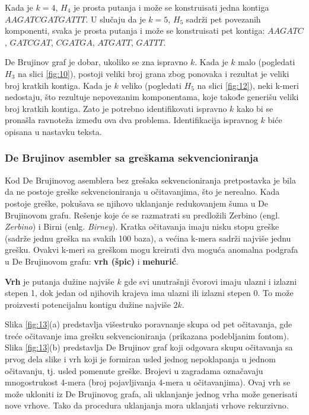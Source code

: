 \documentclass[12pt,oneside]{memoir}
\begin{document}
Kada je $k = 4$, $H_4$ je prosta putanja i može se konstruisati jedna kontiga $AAGATCGATGATTT$. U slučaju da je $k = 5$, $H_5$ sadrži pet povezanih komponenti, svaka je prosta putanja i može se konstruisati pet kontiga: $AAGATC$, $GATCGAT$, $CGATGA$, $ATGATT$, $GATTT$.

De Brujinov graf je dobar, ukoliko se zna ispravno $k$. Kada je $k$ malo (pogledati $H_3$ na slici \ref{fig:10}), postoji veliki broj grana zbog ponovaka i rezultat je veliki broj kratkih kontiga. Kada je $k$ veliko (pogledati $H_5$ na slici \ref{fig:12}), neki k-meri nedostaju, što rezultuje nepovezanim komponentama, koje takođe generišu veliki broj kratkih kontiga. Zato je potrebno identifikovati ispravno $k$ kako bi se pronašla ravnoteža između ova dva problema. Identifikacija ispravnog $k$ biće opisana u nastavku teksta.

\subsubsection{De Brujinov asembler sa greškama sekvencioniranja}

Kod De Brujinovog asemblera bez grešaka sekvencioniranja pretpostavka je bila da ne postoje greške sekvencioniranja u očitavanjima, što je nerealno. Kada postoje greške, pokušava se njihovo uklanjanje redukovanjem šuma u De Brujinovom grafu. Rešenje koje će se razmatrati su predložili Zerbino (engl. \textit{Zerbino}) i Birni (enlg. \textit{Birney}). Kratka očitavanja imaju nisku stopu greške (sadrže jednu greška na svakih 100 baza), a većina k-mera sadrži najviše jednu grešku. Ovakvi k-meri sa greškom mogu kreirati dva moguća anomalna podgrafa u De Brujinovom grafu: \textbf{vrh (špic)} i \textbf{mehurić}.

\textbf{Vrh} je putanja dužine najviše $k$ gde svi unutrašnji čvorovi imaju ulazni i izlazni stepen 1, dok jedan od njihovih krajeva ima ulazni ili izlazni stepen 0. To može proizvesti potencijalnu kontigu dužine najviše $2k$.

Slika \ref{fig:13}(a) predstavlja višestruko poravnanje skupa od pet očitavanja, gde treće očitavanje ima grešku sekvencioniranja (prikazana podebljanim fontom). Slika \ref{fig:13}(b) predstavlja De Brujinov graf koji odgovara skupu očitavanja sa prvog dela slike i vrh koji je formiran usled jednog nepoklapanja u jednom očitavanju, tj. usled pomenute greške. Brojevi u zagradama označavaju mnogostrukost 4-mera (broj pojavljivanja 4-mera u očitavanjima). Ovaj vrh se može ukloniti iz De Brujinovog grafa, ali uklanjanje jednog vrha može generisati nove vrhove. Tako da procedura uklanjanja mora uklanjati vrhove rekurzivno.
\end{document}
